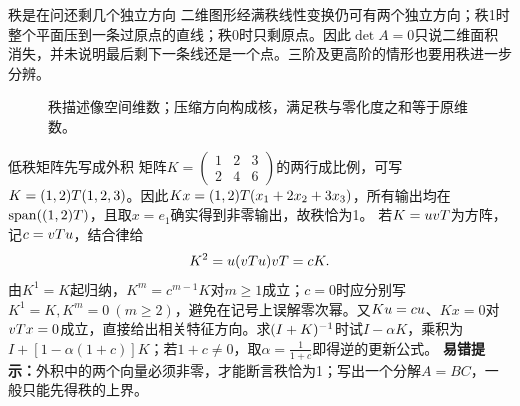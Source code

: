 \begin{insight}{秩是在问还剩几个独立方向}
二维图形经满秩线性变换仍可有两个独立方向；秩1时整个平面压到一条过原点的直线；秩0时只剩原点。因此$\det A=0$只说二维面积消失，并未说明最后剩下一条线还是一个点。三阶及更高阶的情形也要用秩进一步分辨。
\end{insight}
\begin{figure}[H]\centering
{}
\caption{秩描述像空间维数；压缩方向构成核，满足秩与零化度之和等于原维数。}\label{fig:rank-collapse}
\end{figure}
\begin{clevertrick}{低秩矩阵先写成外积}
矩阵$K=\begin{pmatrix}1&2&3\\2&4&6\end{pmatrix}$的两行成比例，可写$K=(1,2)T(1,2,3)$。因此$Kx=(1,2)T(x_1+2x_2+3x_3)$，所有输出均在$\operatorname{span}((1,2)T)$，且取$x=e_1$确实得到非零输出，故秩恰为1。
若$K=uvT$为方阵，记$c=vTu$，结合律给
\[K^2=u(vTu)vT=cK.\]
由$K^1=K$起归纳，$K^m=c^{m-1}K$对$m\ge1$成立；$c=0$时应分别写$K^1=K,K^m=0\ (m\ge2)$，避免在记号上误解零次幂。又$Ku=cu$、$Kx=0$对$vT x=0$成立，直接给出相关特征方向。求$(I+K)^{-1}$时试$I-\alpha K$，乘积为$I+[1-\alpha(1+c)]K$；若$1+c\ne0$，取$\alpha=\frac{1}{1+c}$即得逆的更新公式。
\textbf{易错提示：}外积中的两个向量必须非零，才能断言秩恰为1；写出一个分解$A=BC$，一般只能先得秩的上界。
\end{clevertrick}
